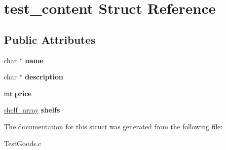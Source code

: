 \hypertarget{structtest__content}{}\section{test\+\_\+content Struct Reference}
\label{structtest__content}
\subsection*{Public Attributes}
\begin{DoxyCompactItemize}
\item 
\hypertarget{structtest__content_a76562996297eeec098ca32a59cf82a7b}{}char $\ast$ {\bfseries name}\label{structtest__content_a76562996297eeec098ca32a59cf82a7b}

\item 
\hypertarget{structtest__content_ae5d665068e79ebc1816da97a627c1dec}{}char $\ast$ {\bfseries description}\label{structtest__content_ae5d665068e79ebc1816da97a627c1dec}

\item 
\hypertarget{structtest__content_a920f24ddd8524ba0500f7b8019eb472c}{}int {\bfseries price}\label{structtest__content_a920f24ddd8524ba0500f7b8019eb472c}

\item 
\hypertarget{structtest__content_a90aa48bcb7fe37259ccd793f7c2212d9}{}\hyperlink{structshelf__array}{shelf\+\_\+array} {\bfseries shelfs}\label{structtest__content_a90aa48bcb7fe37259ccd793f7c2212d9}

\end{DoxyCompactItemize}


The documentation for this struct was generated from the following file\+:\begin{DoxyCompactItemize}
\item 
Test\+Goods.\+c\end{DoxyCompactItemize}
